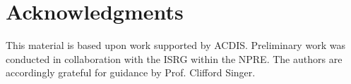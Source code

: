 \documentclass{anstrans}
\begin{document}
\section{Acknowledgments}

This material is based upon work supported by \gls{ACDIS}. Preliminary work was 
conducted in collaboration with the \gls{ISRG} within the \gls{NPRE}. The 
authors are accordingly grateful for guidance by Prof. Clifford Singer.



\end{document}
